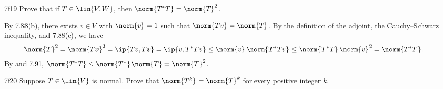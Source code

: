 \begin{exercise}{7f19}
    Prove that if $T \in \lin{V, W}$, then $\norm{T^\ast T} = \norm{T}^2$.


\end{exercise}

\begin{soliff}
    \rightineq By 7.88(b), there exists $v \in V$ with $\norm{v} = 1$ such that $\norm{Tv} = \norm{T}$.
    By the definition of the adjoint, the Cauchy--Schwarz inequality, and 7.88(c), we have
    \[
        \norm{T}^2 = \norm{Tv}^2 = \ip{T v, T v} = \ip{v, T^\ast T v} \leq \norm{v}\,\norm{T^\ast T v} \leq \norm{T^\ast T}\,\norm{v}^2 = \norm{T^\ast T}.
    \]
    \leftineq By  and 7.91, $\norm{T^\ast T} \leq \norm{T^\ast}\,\norm{T} = \norm{T}^2$.
\end{soliff}

\begin{exercise}{7f20}
    Suppose $T \in \lin{V}$ is normal.
    Prove that $\norm{T^k} = \norm{T}^k$ for every positive integer $k$.
\end{exercise}

